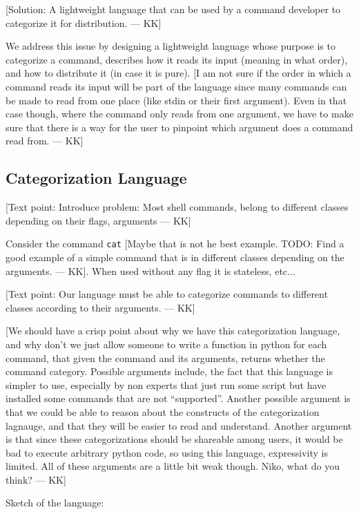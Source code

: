 \documentclass[sigplan,10pt,review,anonymous]{acmart}
\newcommand{\kk}[1]{[{\color{magenta}#1 --- KK}]}
\begin{document}
\kk{Solution: A lightweight language that can be used by a command
  developer to categorize it for distribution.}

We address this issue by designing a lightweight language whose
purpose is to categorize a command, describes how it reads its input
(meaning in what order), and how to distribute it (in case it is
pure). \kk{I am not sure if the order in which a command reads its
  input will be part of the language since many commands can be made
  to read from one place (like stdin or their first argument). Even in
  that case though, where the command only reads from one argument, we
  have to make sure that there is a way for the user to pinpoint which
  argument does a command read from.}

\subsection{Categorization Language}

\kk{Text point: Introduce problem: Most shell commands, belong to
  different classes depending on their flags, arguments}

Consider the command \texttt{cat} \kk{Maybe that is not he best
  example. TODO: Find a good example of a simple command that is in
  different classes depending on the arguments.}. When used without
any flag it is stateless, etc...

\kk{Text point: Our language must be able to categorize commands to
  different classes according to their arguments.}

\kk{We should have a crisp point about why we have this categorization
  language, and why don't we just allow someone to write a function in
  python for each command, that given the command and its arguments,
  returns whether the command category. Possible arguments include,
  the fact that this language is simpler to use, especially by non
  experts that just run some script but have installed some commands
  that are not ``supported''. Another possible argument is that we
  could be able to reason about the constructs of the categorization
  lagnauge, and that they will be easier to read and
  understand. Another argument is that since these categorizations
  should be shareable among users, it would be bad to execute
  arbitrary python code, so using this language, expressivity is
  limited. All of these arguments are a little bit weak though. Niko,
  what do you think?}

Sketch of the language:
\end{document}
